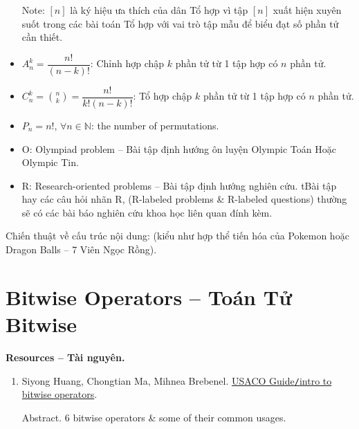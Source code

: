 \documentclass{article}
\begin{document}
\begin{itemize}
    Note: $[n]$ là ký hiệu ưa thích của dân Tổ hợp vì tập $[n]$ xuất hiện xuyên suốt trong các bài toán Tổ hợp với vai trò tập mẫu để biểu đạt số phần tử cần thiết.
    \item $A_n^k = \dfrac{n!}{(n - k)!}$: Chỉnh hợp chập $k$ phần tử từ 1 tập hợp có $n$ phần tử.
    \item $C_n^k = \binom{n}{k} = \dfrac{n!}{k!(n - k)!}$: Tổ hợp chập $k$ phần tử từ 1 tập hợp có $n$ phần tử.
    \item $P_n = n!$, $\forall n\in\mathbb{N}$: the number of permutations.
    \item O: Olympiad problem -- Bài tập định hướng ôn luyện Olympic Toán Hoặc Olympic Tin.
    \item R: Research-oriented problems -- Bài tập định hướng nghiên cứu. tBài tập hay các câu hỏi nhãn R, (R-labeled problems \& R-labeled questions) thường sẽ có các bài báo nghiên cứu khoa học liên quan đính kèm.
\end{itemize}


Chiến thuật về cấu trúc nội dung:  (kiểu như hợp thể tiến hóa của Pokemon hoặc Dragon Balls -- 7 Viên Ngọc Rồng).

\section{Bitwise Operators -- Toán Tử Bitwise}
\textbf{\textsf{Resources -- Tài nguyên.}}
\begin{enumerate}
    \item {\sc Siyong Huang, Chongtian Ma, Mihnea Brebenel}. \href{https://usaco.guide/silver/intro-bitwise}{USACO Guide{\tt/}intro to bitwise operators}.

    {\sf Abstract.} 6 bitwise operators \& some of their common usages.
\end{enumerate}
\end{document}
